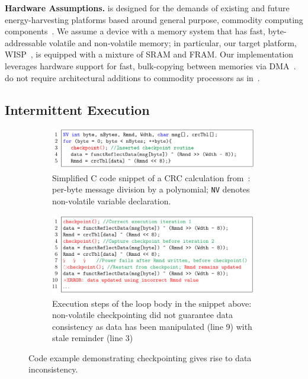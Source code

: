 \textbf{Hardware Assumptions.} \sys is designed for the demands of existing and
future energy-harvesting platforms based around general purpose, commodity
computing components~\cite{wisp,msp430datasheet}. We assume a device with a
memory system that has fast, byte-addressable volatile and non-volatile memory;
in particular, our target platform, WISP~\cite{wisp}, is equipped with a
mixture of SRAM and FRAM. Our implementation leverages hardware support for
fast, bulk-copying between memories via DMA~\cite{msp430datasheet}. \sys do not
require architectural additions to commodity processors as
in~\cite{su_date_2017,hicks_isca_2017,quickrecall,nvp}.

\subsection{Intermittent Execution}
\label{sec:background_consistency}

\begin{figure}
	\begin{subfigure}[t]{\linewidth}
		\centering \includegraphics[width=\columnwidth]{figures/crc_example}
		\caption{Simplified C code snippet of a CRC calculation from~\cite{hicks_mibench2_2016}: per-byte message division by a polynomial; \texttt{NV} denotes non-volatile variable declaration.}\label{fig:crc_example}
	\end{subfigure}
	\begin{subfigure}[t]{\linewidth}
		\centering \includegraphics[width=\columnwidth]{figures/crc_example_war}
		\caption{Execution steps of the loop body in the snippet above: non-volatile checkpointing did not guarantee data consistency as data has been manipulated (line 9) with stale reminder (line 3)}\label{fig:crc_example_war}
	\end{subfigure}
	\caption{Code example demonstrating checkpointing gives rise to data inconsistency.}\label{fig:code_demo_incosistency}
\end{figure}

